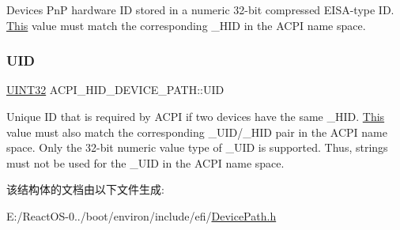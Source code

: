 Device\textquotesingle{}s PnP hardware ID stored in a numeric 32-\/bit compressed E\+I\+S\+A-\/type ID. \hyperlink{namespace_this}{This} value must match the corresponding \+\_\+\+H\+ID in the A\+C\+PI name space. \mbox{\label{struct_a_c_p_i___h_i_d___d_e_v_i_c_e___p_a_t_h_a93013cae5fc357807aa9fb8f4b6e74c1}} 
\subsubsection{\texorpdfstring{U\+ID}{UID}}
{\footnotesize\ttfamily \hyperlink{_processor_bind_8h_ae1e6edbbc26d6fbc71a90190d0266018}{U\+I\+N\+T32} A\+C\+P\+I\+\_\+\+H\+I\+D\+\_\+\+D\+E\+V\+I\+C\+E\+\_\+\+P\+A\+T\+H\+::\+U\+ID}

Unique ID that is required by A\+C\+PI if two devices have the same \+\_\+\+H\+ID. \hyperlink{namespace_this}{This} value must also match the corresponding \+\_\+\+U\+I\+D/\+\_\+\+H\+ID pair in the A\+C\+PI name space. Only the 32-\/bit numeric value type of \+\_\+\+U\+ID is supported. Thus, strings must not be used for the \+\_\+\+U\+ID in the A\+C\+PI name space. 

该结构体的文档由以下文件生成\+:\begin{DoxyCompactItemize}
\item 
E\+:/\+React\+O\+S-\/0../boot/environ/include/efi/\hyperlink{_device_path_8h}{Device\+Path.\+h}\end{DoxyCompactItemize}
